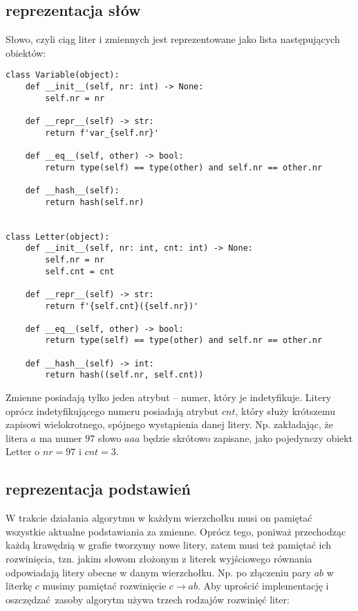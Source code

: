 \documentclass[leqno, 12pt]{article}
\begin{document}
\subsection{reprezentacja słów}
Słowo, czyli ciąg liter i zmiennych jest reprezentowane jako lista następujących obiektów:
\begin{verbatim}
class Variable(object):
    def __init__(self, nr: int) -> None:
        self.nr = nr

    def __repr__(self) -> str:
        return f'var_{self.nr}'

    def __eq__(self, other) -> bool:
        return type(self) == type(other) and self.nr == other.nr
    
    def __hash__(self):
        return hash(self.nr)


class Letter(object):
    def __init__(self, nr: int, cnt: int) -> None:
        self.nr = nr
        self.cnt = cnt

    def __repr__(self) -> str:
        return f'{self.cnt}({self.nr})'

    def __eq__(self, other) -> bool:
        return type(self) == type(other) and self.nr == other.nr

    def __hash__(self) -> int:
        return hash((self.nr, self.cnt))
\end{verbatim}
Zmienne posiadają tylko jeden atrybut -- numer, który je indetyfikuje. Litery oprócz indetyfikującego numeru posiadają atrybut $cnt$, który służy krótszemu zapisowi wielokrotnego, spójnego wystąpienia danej litery. Np. zakładając, że litera $a$ ma numer $97$ słowo $aaa$ będzie skrótowo zapisane, jako pojedynczy obiekt Letter o $nr = 97$ i $cnt = 3$.


\subsection{reprezentacja podstawień}
W trakcie działania algorytmu w każdym wierzchołku musi on pamiętać wszystkie aktualne podstawiania za zmienne. Oprócz tego, poniważ przechodząc każdą krawędzią w grafie tworzymy nowe litery, zatem musi też pamiętać ich rozwinięcia, tzn. jakim słowom złożonym z literek wyjściowego równania odpowiadają litery obecne w danym wierzchołku. Np. po złączeniu pary $ab$ w literkę $c$ musimy pamiętać rozwinięcie $c \rightarrow ab$.\newline\newline
Aby uprościć implementację i oszczędzać zasoby algorytm używa trzech rodzajów rozwinięć liter:
\end{document}
